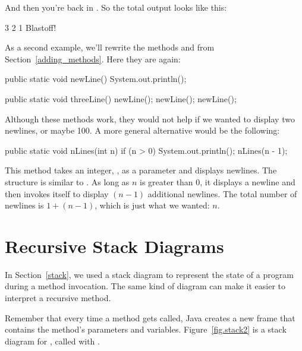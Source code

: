 And then you're back in .
So the total output looks like this:

\begin{stdout}
3
2
1
Blastoff!
\end{stdout}

As a second example, we'll rewrite the methods  and  from Section~\ref{adding_methods}.
Here they are again:

\begin{code}
public static void newLine() {
    System.out.println();
}

public static void threeLine() {
    newLine();
    newLine();
    newLine();
}
\end{code}


Although these methods work, they would not help if we wanted to display two newlines, or maybe 100.
A more general alternative would be the following:

\begin{code}
public static void nLines(int n) {
    if (n > 0) {
        System.out.println();
        nLines(n - 1);
    }
}
\end{code}

This method takes an integer, , as a parameter and displays  newlines.
The structure is similar to .
As long as $n$ is greater than 0, it displays a newline and then invokes itself to display $(n-1)$ additional newlines.
The total number of newlines is $1 + (n - 1)$, which is just what we wanted: $n$.


\section{Recursive Stack Diagrams}


In Section~\ref{stack}, we used a stack diagram to represent the state of a program during a method invocation.
The same kind of diagram can make it easier to interpret a recursive method.

Remember that every time a method gets called, Java creates a new frame that contains the method's parameters and variables.
Figure~\ref{fig.stack2} is a stack diagram for , called with .

